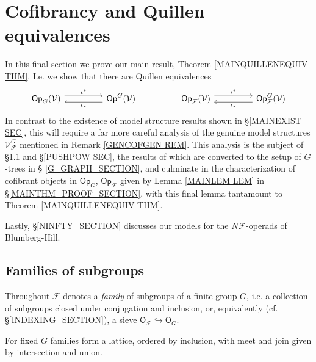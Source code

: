 \documentclass[a4paper,10pt]{article}%
\begin{document}




\section{Cofibrancy and Quillen equivalences}\label{COFIB SEC}

In this final section we prove our main result, Theorem \ref{MAINQUILLENEQUIV THM}. I.e. we show 
that there are Quillen equivalences
\[
\begin{tikzcd}[column sep =4.5em]
	\mathsf{Op}_{G}(\mathcal{V}) 
	\arrow[r, shift left=1.5,swap,"\iota^{\**}"']
&
	\mathsf{Op}^G(\mathcal{V})
	\ar[shift left=1.5]{l}{\iota_{\**}}
&
	\mathsf{Op}_{\mathcal{F}}(\mathcal{V}) 
	\arrow[r, shift left=1.5,swap,"\iota^{\**}"']
&
	\mathsf{Op}^G_{\mathcal{F}}(\mathcal{V})
	\ar[shift left=1.5]{l}{\iota_{\**}}
\end{tikzcd}
\]
In contrast to the existence of model structure results shown in \S \ref{MAINEXIST SEC},
this will require a far more careful analysis of the  
genuine model structures
$\mathcal{V}^G_{\mathcal{F}}$ mentioned in 
Remark \ref{GENCOFGEN REM}. This analysis is the subject of \S \ref{FAMILY_SEC} and \S \ref{PUSHPOW SEC}, the results of which are converted 
to the setup of $G$-trees in \S
\ref{G_GRAPH_SECTION},
and culminate in 
the characterization of cofibrant objects in
$\mathsf{Op}_{G}$,
$\mathsf{Op}_{\mathcal{F}}$ given by
Lemma \ref{MAINLEM LEM}
in \S \ref{MAINTHM_PROOF_SECTION},
with this final lemma tantamount to 
Theorem \ref{MAINQUILLENEQUIV THM}.

Lastly, \S \ref{NINFTY_SECTION} discusses our models for the 
$N \mathcal{F}$-operads of Blumberg-Hill.

\subsection{Families of subgroups}
\label{FAMILY_SEC}

Throughout 
$\mathcal{F}$ denotes a \textit{family} of subgroups of a finite group $G$, i.e. a collection of subgroups closed under conjugation and inclusion, or, equivalently
(cf. \S \ref{INDEXING_SECTION}),
a sieve 
$
\mathsf{O}_{\mathcal{F}}
	\hookrightarrow 
\mathsf{O}_G
$.

\begin{remark}
For fixed $G$ families form a lattice, ordered by inclusion, 
with meet and join given by intersection and union.
\end{remark}
\end{document}
